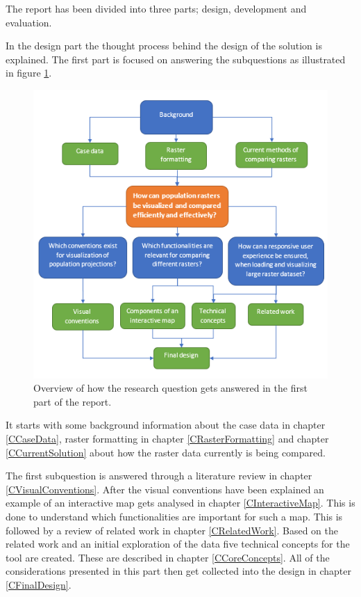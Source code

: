 %
%

The report has been divided into three parts; design, development and evaluation.

In the design part the thought process behind the design of the solution is explained.
The first part is focused on answering the subquestions as illustrated in figure \ref{Structure}. 


\begin{figure} [H]
	\centering
	\includegraphics[width=1\textwidth]{Pictures/ReportStructure}
	\caption{Overview of how the research question gets answered in the first part of the report.}
	\label{Structure}
\end{figure}

It starts with some background information about the case data in chapter \ref{CCaseData}, raster formatting in chapter \ref{CRasterFormatting} and chapter \ref{CCurrentSolution} about how the raster data currently is being compared. 

The first subquestion is answered through a literature review in chapter \ref{CVisualConventions}. After the visual conventions have been explained an example of an interactive map gets analysed in chapter \ref{CInteractiveMap}. This is done to understand which functionalities are important for such a map. This is followed by a review of related work in chapter \ref{CRelatedWork}. Based on the related work and an initial exploration of the data five technical concepts for the tool are created. These are described in chapter \ref{CCoreConcepts}. All of the considerations presented in this part then get collected into the design in chapter \ref{CFinalDesign}. 

